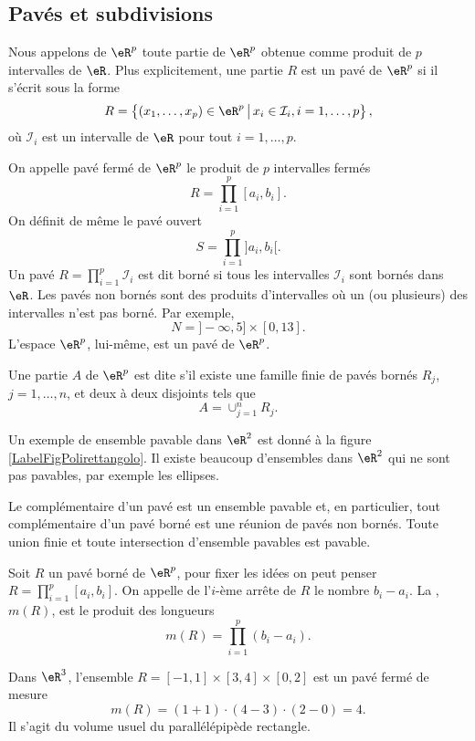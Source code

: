 \subsection{Pavés et subdivisions}

\begin{definition}
 Nous appelons  de $\eR^p$ toute partie de $\eR^p$ obtenue comme produit de $p$ intervalles de $\eR$. Plus explicitement, une partie $R$ est un pavé de $\eR^p$ si il s'écrit sous la forme
\[
R=\left\{(x_1,\ldots, x_p)\in\eR^p \,\big\vert\,x_i\in \mathcal{I}_i,  i=1,\ldots, p  \right\},
\]
où $\mathcal{I}_i$ est un intervalle de $\eR$ pour tout $i=1,\ldots, p$. 
\end{definition}
On appelle pavé fermé de $\eR^p$ le produit de $p$ intervalles fermés 
\[
R=\prod_{i=1}^{p}[a_i,b_i].
\]
On définit de même le pavé ouvert 
\[
S=\prod_{i=1}^{p}]a_i,b_i[.
\]
Un pavé $ R=\prod_{i=1}^{p}\mathcal{I}_i$ est dit borné si tous les intervalles $\mathcal{I}_i$ sont bornés dans $\eR$. Les pavés non bornés sont des produits d'intervalles où un (ou plusieurs) des intervalles n'est pas borné. Par exemple,
\[
N=]-\infty, 5]\times [0,13].
\]
L'espace $\eR^p$, lui-même, est un pavé de $\eR^p$. 
\begin{definition}
  Une partie $A$ de $\eR^p$ est dite   s'il existe une famille finie de pavés bornés $R_j$, $j=1,\ldots, n$, et deux à deux disjoints tels que 
\[
A=\cup_{j=1}^{n}R_j.
\] 
\end{definition}
Un exemple de ensemble pavable dans $\eR^2$ est donné à la figure \ref{LabelFigPolirettangolo}. Il existe beaucoup d'ensembles dans $\eR^2$ qui ne sont pas pavables, par exemple les ellipses.
\newcommand{\CaptionFigPolirettangolo}{Un ensemble pavable.}


Le complémentaire d'un pavé est  un ensemble pavable et, en particulier, tout complémentaire d'un pavé borné est une réunion de  pavés non bornés. Toute union finie et toute intersection d'ensemble pavables est pavable.    
\begin{definition}
	Soit $R$ un pavé borné de $\eR^p$, pour fixer les idées on peut penser $R=\prod_{i=1}^{p}[a_i,b_i]$. On appelle  de l'$i$-ème arrête de $R$ le nombre $b_i-a_i$. La , $m(R)$, est le produit des longueurs 
\[
m(R)=\prod_{i=1}^{p}(b_i-a_i).
\] 
\end{definition}
\begin{example}
  Dans $\eR^3$, l'ensemble $R=[-1,1]\times[3,4]\times[0,2]$ est un pavé fermé de mesure 
\[
m(R)= (1+1)\cdot(4-3)\cdot(2-0)=4.
\] 
Il s'agit du volume usuel du parallélépipède rectangle.
\end{example}

